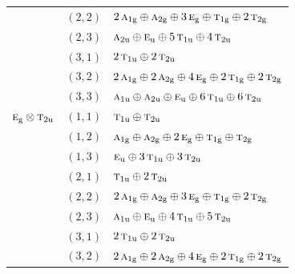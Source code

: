 \documentclass[11pt]{article}
\newcommand{\irr}[1]{\text{\normalfont\scshape #1}}
\newcommand{\ptag}[1]{\mathrm{#1}}
\begin{document}
\begin{longtable}{p{} c p{}}
 & $(2,2)$ & $2\,\irr{a}_{1\ptag{g}}\oplus \irr{a}_{2\ptag{g}}\oplus 3\,\irr{e}_{\ptag{g}}\oplus \irr{t}_{1\ptag{g}}\oplus 2\,\irr{t}_{2\ptag{g}}$\\

 & $(2,3)$ & $\irr{a}_{2\ptag{u}}\oplus \irr{e}_{\ptag{u}}\oplus 5\,\irr{t}_{1\ptag{u}}\oplus 4\,\irr{t}_{2\ptag{u}}$\\

 & $(3,1)$ & $2\,\irr{t}_{1\ptag{u}}\oplus 2\,\irr{t}_{2\ptag{u}}$\\

 & $(3,2)$ & $2\,\irr{a}_{1\ptag{g}}\oplus 2\,\irr{a}_{2\ptag{g}}\oplus 4\,\irr{e}_{\ptag{g}}\oplus 2\,\irr{t}_{1\ptag{g}}\oplus 2\,\irr{t}_{2\ptag{g}}$\\

 & $(3,3)$ & $\irr{a}_{1\ptag{u}}\oplus \irr{a}_{2\ptag{u}}\oplus \irr{e}_{\ptag{u}}\oplus 6\,\irr{t}_{1\ptag{u}}\oplus 6\,\irr{t}_{2\ptag{u}}$\\

\hline

$\irr{e}_{\ptag{g}}\otimes \irr{t}_{2\ptag{u}}$ & $(1,1)$ & $\irr{t}_{1\ptag{u}}\oplus \irr{t}_{2\ptag{u}}$\\

 & $(1,2)$ & $\irr{a}_{1\ptag{g}}\oplus \irr{a}_{2\ptag{g}}\oplus 2\,\irr{e}_{\ptag{g}}\oplus \irr{t}_{1\ptag{g}}\oplus \irr{t}_{2\ptag{g}}$\\

 & $(1,3)$ & $\irr{e}_{\ptag{u}}\oplus 3\,\irr{t}_{1\ptag{u}}\oplus 3\,\irr{t}_{2\ptag{u}}$\\

 & $(2,1)$ & $\irr{t}_{1\ptag{u}}\oplus 2\,\irr{t}_{2\ptag{u}}$\\

 & $(2,2)$ & $2\,\irr{a}_{1\ptag{g}}\oplus \irr{a}_{2\ptag{g}}\oplus 3\,\irr{e}_{\ptag{g}}\oplus \irr{t}_{1\ptag{g}}\oplus 2\,\irr{t}_{2\ptag{g}}$\\

 & $(2,3)$ & $\irr{a}_{1\ptag{u}}\oplus \irr{e}_{\ptag{u}}\oplus 4\,\irr{t}_{1\ptag{u}}\oplus 5\,\irr{t}_{2\ptag{u}}$\\

 & $(3,1)$ & $2\,\irr{t}_{1\ptag{u}}\oplus 2\,\irr{t}_{2\ptag{u}}$\\

 & $(3,2)$ & $2\,\irr{a}_{1\ptag{g}}\oplus 2\,\irr{a}_{2\ptag{g}}\oplus 4\,\irr{e}_{\ptag{g}}\oplus 2\,\irr{t}_{1\ptag{g}}\oplus 2\,\irr{t}_{2\ptag{g}}$\\


\end{longtable}
\end{document}
